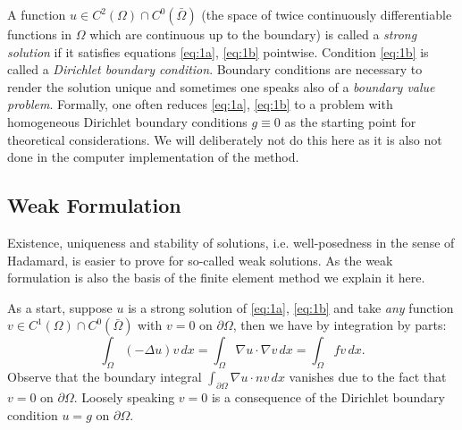 \documentclass[a4paper,12pt]{article}
\begin{document}
A function $u\in C^2(\Omega)\cap C^0(\bar\Omega)$ 
(the space of twice continuously differentiable functions in $\Omega$ which are continuous
up to the boundary)
is called a {\em strong solution}
if it satisfies equations \eqref{eq:1a}, \eqref{eq:1b} pointwise. 
Condition \eqref{eq:1b} is called a {\em Dirichlet boundary condition}. Boundary conditions
are necessary to render the solution unique and sometimes one speaks also
of a {\em boundary value problem}.
Formally, one often reduces \eqref{eq:1a}, \eqref{eq:1b}
to a problem with homogeneous Dirichlet boundary conditions $g\equiv 0$ as the
starting point for theoretical considerations. We will deliberately not do this
here as it is also not done in the computer implementation of the method. 

\subsection{Weak Formulation}

Existence, uniqueness and stability of solutions, i.e. well-posedness in the
sense of Hadamard, is easier to prove for so-called weak solutions. As the weak
formulation is also the basis of the finite element method we explain it here.

As a start, suppose $u$ is a strong solution of \eqref{eq:1a}, \eqref{eq:1b} and take 
{\em any } function
$v\in C^1(\Omega)\cap C^0(\bar\Omega)$ with $v=0$ on $\partial\Omega$, then we
have by integration by parts:
\begin{equation*}
\int_\Omega (-\Delta u) v \,dx = 
\int_\Omega \nabla u \cdot \nabla v \,dx= \int_\Omega fv \,dx.
\end{equation*}
Observe that the boundary integral $\int_{\partial\Omega} \nabla u\cdot n v\,dx$ vanishes
due to the fact that $v=0$ on $\partial\Omega$. Loosely speaking $v=0$ is a consequence
of the Dirichlet boundary condition $u=g$ on $\partial\Omega$.
\end{document}
